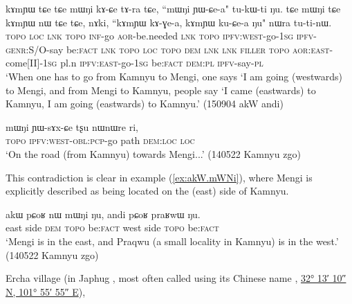 \begin{exe}
\ex \label{ex:kAmYW.mWNi}
\gll kɤmɲɯ tɕe tɕe mɯŋi kɤ-ɕe tɤ-ra tɕe, ``mɯŋi ɲɯ-ɕe-a" tu-kɯ-ti ŋu.
tɕe mɯŋi tɕe kɤmɲɯ nɯ tɕe tɕe, nɤki, ``kɤmɲɯ kɤ-ɣe-a, kɤmɲɯ ku-ɕe-a ŋu" nɯra tu-ti-nɯ. \\
\textsc{topo} \textsc{loc} \textsc{lnk}  \textsc{topo} \textsc{inf}-go \textsc{aor}-be.needed \textsc{lnk}  \textsc{topo} \textsc{ipfv}:\textsc{west}-go-\textsc{1sg} \textsc{ipfv}-\textsc{genr}:S/O-say be:\textsc{fact} \textsc{lnk}  \textsc{topo} \textsc{loc}  \textsc{topo} \textsc{dem} \textsc{lnk} \textsc{lnk} \textsc{filler}  \textsc{topo} \textsc{aor}:\textsc{east}-come[II]-\textsc{1sg} pl.n \textsc{ipfv}:\textsc{east}-go-\textsc{1sg} be:\textsc{fact} \textsc{dem}:\textsc{pl} \textsc{ipfv}-say-\textsc{pl} \\
\glt `When one has to go from Kamnyu to Mengi, one says `I am going (westwards) to Mengi, and from Mengi to Kamnyu, people say `I came (eastwards)  to Kamnyu, I am going (eastwards) to Kamnyu.' (150904 akW andi)
\end{exe}

\begin{exe}
\ex \label{ex:mWNi.YWsAxCe}
\gll mɯŋi ɲɯ-sɤx-ɕe tʂu nɯnɯre ri, \\
\textsc{topo} \textsc{ipfv}:\textsc{west}-\textsc{obl}:\textsc{pcp}-go path \textsc{dem}:\textsc{loc} \textsc{loc} \\
\glt `On the road (from Kamnyu) towards Mengi...' (140522 Kamnyu zgo) 
\end{exe}

This contradiction is clear in example (\ref{ex:akW.mWNi}), where Mengi is explicitly described as being located on the  (east) side of Kamnyu.

\begin{exe}
\ex \label{ex:akW.mWNi}
\gll akɯ pɕoʁ nɯ mɯŋi ŋu, andi pɕoʁ praʁwɯ ŋu. \\
 east side \textsc{dem}  \textsc{topo} be:\textsc{fact} west side  \textsc{topo} be:\textsc{fact} \\
\glt `Mengi is in the east, and Praqwu (a small locality in Kamnyu) is in the west.' (140522 Kamnyu zgo) 
\end{exe}

Ercha village (in Japhug , most often called using its Chinese name  , \href{https://geohack.toolforge.org/geohack.php?params=32.219530245125554_N_101.93203109826473_E}{32° 13′ 10″ N, 101° 55′ 55″ E}), 

